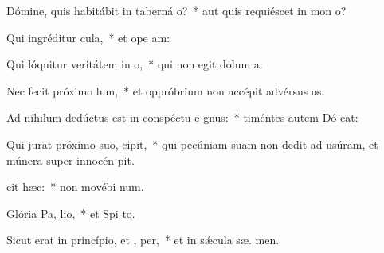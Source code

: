 \item Dómine, quis habitábit in taberná o?~* aut quis requiéscet in mon  o?
\item Qui ingréditur  cula,~* et ope am:
\item Qui lóquitur veritátem in  o,~* qui non egit dolum   a:
\item Nec fecit próximo  lum,~* et oppróbrium non accépit advérsus  os.
\item Ad níhilum dedúctus est in conspéctu e gnus:~* timéntes autem Dó cat:
\item Qui jurat próximo suo,   cipit,~* qui pecúniam suam non dedit ad usúram, et múnera super innocén  pit.
\item {} cit hæc:~* non movébi  num.
\item Glória Pa,  lio,~* et Spi to.
\item Sicut erat in princípio, et ,  per,~* et in sǽcula sæ. men.
